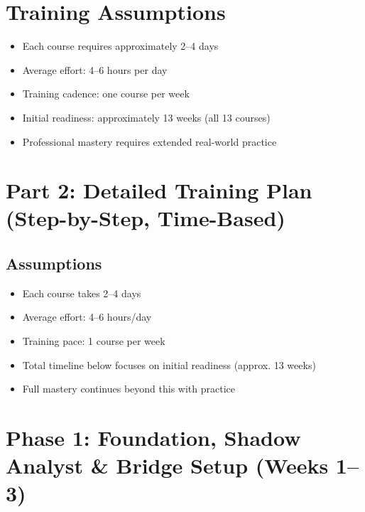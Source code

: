 \documentclass[12pt]{article}
\begin{document}
	\section*{Training Assumptions}
	
	\begin{itemize}
		\item Each course requires approximately 2–4 days
		\item Average effort: 4–6 hours per day
		\item Training cadence: one course per week
		\item Initial readiness: approximately 13 weeks (all 13 courses)
		\item Professional mastery requires extended real-world practice
	\end{itemize}
	
	\newpage
	
	\section*{Part 2: Detailed Training Plan (Step-by-Step, Time-Based)}
	
	\subsection*{Assumptions}
	\begin{itemize}
		\item Each course takes 2–4 days
		\item Average effort: 4–6 hours/day
		\item Training pace: 1 course per week
		\item Total timeline below focuses on initial readiness (approx. 13 weeks)
		\item Full mastery continues beyond this with practice
	\end{itemize}
	
	\vspace{0.5cm}
	
	\section*{Phase 1: Foundation, Shadow Analyst \& Bridge Setup (Weeks 1–3)}
	
\end{document}
